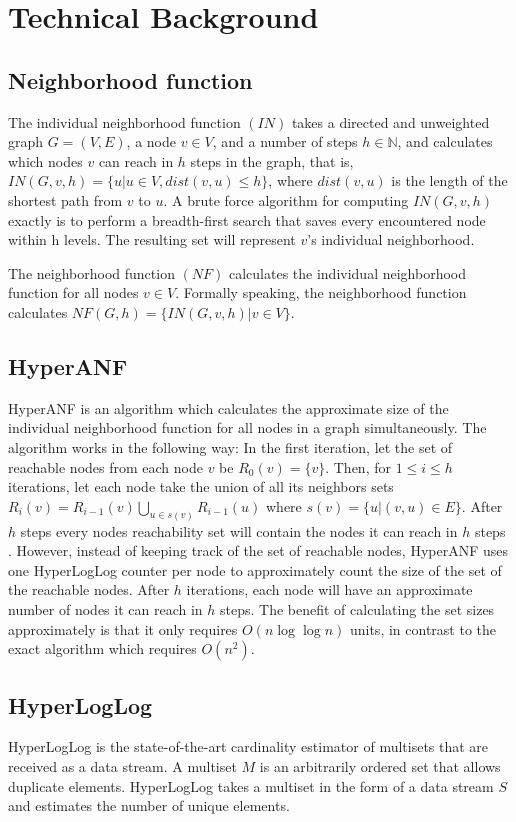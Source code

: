 \chapter{Technical Background}

\section{Neighborhood function}
The individual neighborhood function $(IN)$ takes a directed and unweighted graph $G = (V,E)$, a node $v \in V$, and a number of steps $h \in \mathbb{N}$, and calculates which nodes $v$ can reach in $h$ steps in the graph, that is, $IN(G,v,h) = \{u | u \in V, dist(v,u) \leq h\}$, where $dist(v,u)$ is the length of the shortest path from $v$ to $u$. A brute force algorithm for computing $IN(G,v,h)$ exactly is to perform a breadth-first search that saves every encountered node within h levels. The resulting set will represent $v$'s individual neighborhood.

The neighborhood function $(NF)$ calculates the individual neighborhood function for all nodes $v \in V$. Formally speaking, the neighborhood function calculates $NF(G,h) = \{ IN(G,v,h) | v \in V \}$.

\section{HyperANF}
HyperANF is an algorithm which calculates the approximate size of the individual neighborhood function for all nodes in a graph simultaneously. The algorithm works in the following way: In the first iteration, let the set of reachable nodes from each node $v$ be $R_0(v) = \{v\}$. Then, for $1 \leq i \leq h$ iterations, let each node take the union of all its neighbors sets $R_i(v) = R_{i-1}(v) \bigcup\limits_{u \in s(v)} R_{i-1}(u) $ where $s(v) = \{u | (v,u) \in E\}$. After $h$ steps every nodes reachability set will contain the nodes it can reach in $h$ steps \cite{hyperball}. However, instead of keeping track of the set of reachable nodes, HyperANF uses one HyperLogLog counter per node to approximately count the size of the set of the reachable nodes. After $h$ iterations, each node will have an approximate number of nodes it can reach in $h$ steps. The benefit of calculating the set sizes approximately is that it only requires $O(n\log\log n)$ units, in contrast to the exact algorithm which requires $O(n^2)$.

\section{HyperLogLog}
HyperLogLog \cite{hyperloglog} is the state-of-the-art cardinality estimator of multisets that are received as a data stream. A multiset $M$ is an arbitrarily ordered set that allows duplicate elements. HyperLogLog takes a multiset in the form of a data stream $S$ and estimates the number of unique elements.

